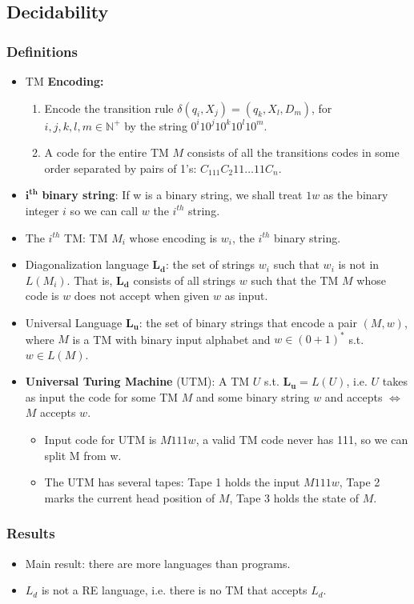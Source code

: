 \subsection{\color{ForestGreen}Decidability}
\subsubsection{Definitions}

\begin{itemize}
    \item TM \textbf{Encoding:}
    \begin{enumerate}
        \item Encode the transition rule $\delta(q_i, X_j) = (q_k , X_l, D_m)$, for $i,j,k,l,m \in \mathbb{N}^+$ by the string $0^i10^j10^k10^l10^m.$ 
        \item A code for the entire TM $M$ consists of all the transitions codes in
some order separated by pairs of 1's: $C_111C_2 11 \hdots11 C_n.$
    \end{enumerate}
    \item $\mathbf{i^{th}}$ \textbf{binary string}: If w is a binary string, we shall treat $1w$ as the binary integer $i$ so we can call $w$ the $i^{th}$ string.
    \item The $i^{th}$ TM: TM $M_i$ whose encoding is $w_i$, the $i^{th}$ binary string. 
    \item Diagonalization language $\mathbf{L_d}$: the set of strings $w_i$
such that $w_i$ is not in $L (M_i)$. That is, $\mathbf{L_d}$ consists of all strings $w$ such that the TM $M$ whose code is $w$ does not accept when given $w$ as input. 
\item Universal Language $\mathbf{L_u}$: the set of binary strings that encode a pair $(M, w) $, where $M$ is a TM with binary input alphabet and $w\in (0 + 1)^*$ s.t. $w \in L(M)$. 
\item \textbf{Universal Turing Machine} (UTM): A TM $U$ s.t. $\mathbf{L_u} = L(U)$, i.e. $U$ takes as input the code for some TM $M$ and some binary string $w$ and accepts $\iff$ $M$ accepts $w$.
\begin{itemize}
    \item  Input code for UTM is $M111w$, a valid TM code never has 111, so we can split M from w.
    \item The UTM has several tapes: Tape 1 holds the input $M111w$, Tape 2 marks the current head position of $M$, Tape 3 holds the state of $M$.

\end{itemize}

\end{itemize}
\subsubsection{Results}
\begin{itemize}
    \item Main result: there are more languages than programs.
    \item $L_d$ is not a RE language, i.e. there is no TM that accepts $L_d$.
\end{itemize}
